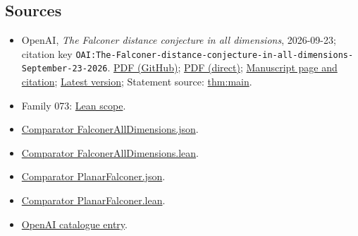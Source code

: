 \documentclass[11pt]{article}
\begin{document}
\subsection{Sources}
\begin{itemize}
\item OpenAI, \emph{The Falconer distance conjecture in all dimensions}, 2026-09-23; citation key \texttt{OAI:The-Falconer-distance-conjecture-in-all-dimensions-September-23-2026}. \href{https://github.com/openai/math/blob/adc7f1241b42e322a6451854ab7e4b4c146bf78a/preprints/The-Falconer-distance-conjecture-in-all-dimensions-September-23-2026/paper.pdf}{PDF (GitHub)}; \href{https://github.com/openai/math/raw/adc7f1241b42e322a6451854ab7e4b4c146bf78a/preprints/The-Falconer-distance-conjecture-in-all-dimensions-September-23-2026/paper.pdf}{PDF (direct)}; \href{https://github.com/openai/math/blob/adc7f1241b42e322a6451854ab7e4b4c146bf78a/preprints/The-Falconer-distance-conjecture-in-all-dimensions-September-23-2026/README.md}{Manuscript page and citation}; \href{https://github.com/openai/math/blob/main/preprints/The-Falconer-distance-conjecture-in-all-dimensions-September-23-2026/paper.pdf}{Latest version}; Statement source: \href{https://github.com/openai/math/blob/adc7f1241b42e322a6451854ab7e4b4c146bf78a/preprints/The-Falconer-distance-conjecture-in-all-dimensions-September-23-2026/build/sections/00\_introduction.tex\#L11}{thm:main}.
\item Family 073: \href{https://github.com/openai/math/blob/adc7f1241b42e322a6451854ab7e4b4c146bf78a/lean/docs/073.md}{Lean scope}.
\item \href{https://github.com/openai/math/blob/adc7f1241b42e322a6451854ab7e4b4c146bf78a/lean/ComparatorChallenges/FalconerAllDimensions.json}{Comparator FalconerAllDimensions.json}.
\item \href{https://github.com/openai/math/blob/adc7f1241b42e322a6451854ab7e4b4c146bf78a/lean/ComparatorChallenges/FalconerAllDimensions.lean}{Comparator FalconerAllDimensions.lean}.
\item \href{https://github.com/openai/math/blob/adc7f1241b42e322a6451854ab7e4b4c146bf78a/lean/ComparatorChallenges/PlanarFalconer.json}{Comparator PlanarFalconer.json}.
\item \href{https://github.com/openai/math/blob/adc7f1241b42e322a6451854ab7e4b4c146bf78a/lean/ComparatorChallenges/PlanarFalconer.lean}{Comparator PlanarFalconer.lean}.
\item \href{https://github.com/openai/math/blob/adc7f1241b42e322a6451854ab7e4b4c146bf78a/CONTENTS.md}{OpenAI catalogue entry}.
\end{itemize}
\end{document}
